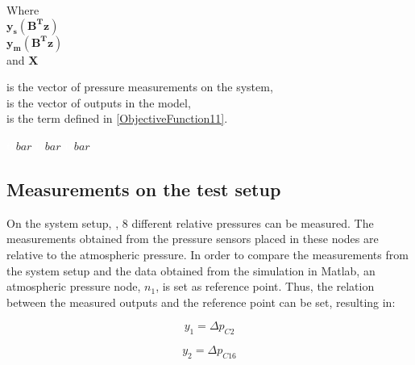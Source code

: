\begin{minipage}[t]{0.20\textwidth}
Where\\
\hspace*{8mm} $\bm{y_{s}(B^T z)}$ \\
\hspace*{8mm} $\bm{y_{m}(B^T z)}$ \\
and \hspace*{0.7mm} $\mathcal{\bm{X}}$ 
\end{minipage}
\begin{minipage}[t]{0.68\textwidth}
\vspace*{2mm}
is the vector of pressure measurements on the system,\\
is the vector of outputs in the model, \\
is the term defined in \eqref{ObjectiveFunction11}.
\end{minipage}
\begin{minipage}[t]{0.10\textwidth}
\vspace*{2mm}
\textcolor{White}{te}$\unit{bar}$
\textcolor{White}{te}$\unit{bar}$
\textcolor{White}{te}$\unit{bar}$
\end{minipage}
\subsection{Measurements on the test setup}

On the system setup, , $8$ different relative pressures can be measured. The measurements obtained from the pressure sensors 
placed in these nodes are relative to the atmospheric pressure. In order to compare the measurements from the system setup and the data 
obtained from the simulation in Matlab, an atmospheric pressure node, $n_1$, is set as reference point. Thus, the relation between the measured 
outputs and the reference point can be set, resulting in:

\vspace{4mm}
\begin{equation}
    y_1 = \Delta p_{C2} 
\end{equation}

\vspace{4mm}
\begin{equation}
   y_2 = \Delta p_{C16} 
 \end{equation}

